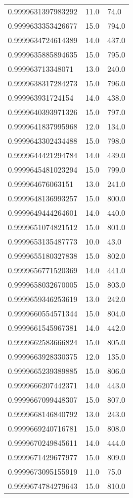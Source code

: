 \begin{center}
\begin{supertabular}[H]{p{0.30\textwidth}p{0.05\textwidth}p{0.05\textwidth}}
0.9999631397983292 & 11.0 & 74.0 \\ 
0.9999633353426677 & 15.0 & 794.0 \\ 
0.9999634724614389 & 14.0 & 437.0 \\ 
0.9999635885894635 & 15.0 & 795.0 \\ 
0.999963713348071 & 13.0 & 240.0 \\ 
0.9999638317284273 & 15.0 & 796.0 \\ 
0.999963931724154 & 14.0 & 438.0 \\ 
0.9999640393971326 & 15.0 & 797.0 \\ 
0.9999641837995968 & 12.0 & 134.0 \\ 
0.9999643302434488 & 15.0 & 798.0 \\ 
0.9999644421294784 & 14.0 & 439.0 \\ 
0.9999645481023294 & 15.0 & 799.0 \\ 
0.999964676063151 & 13.0 & 241.0 \\ 
0.9999648136993257 & 15.0 & 800.0 \\ 
0.9999649444264601 & 14.0 & 440.0 \\ 
0.9999651074821512 & 15.0 & 801.0 \\ 
0.9999653135487773 & 10.0 & 43.0 \\ 
0.9999655180327838 & 15.0 & 802.0 \\ 
0.9999656771520369 & 14.0 & 441.0 \\ 
0.9999658032670005 & 15.0 & 803.0 \\ 
0.9999659346253619 & 13.0 & 242.0 \\ 
0.9999660554571344 & 15.0 & 804.0 \\ 
0.9999661545967381 & 14.0 & 442.0 \\ 
0.9999662583666824 & 15.0 & 805.0 \\ 
0.9999663928330375 & 12.0 & 135.0 \\ 
0.9999665239389885 & 15.0 & 806.0 \\ 
0.9999666207442371 & 14.0 & 443.0 \\ 
0.9999667099448307 & 15.0 & 807.0 \\ 
0.9999668146840792 & 13.0 & 243.0 \\ 
0.9999669240716781 & 15.0 & 808.0 \\ 
0.9999670249845611 & 14.0 & 444.0 \\ 
0.9999671429677977 & 15.0 & 809.0 \\ 
0.9999673095155919 & 11.0 & 75.0 \\ 
0.9999674784279643 & 15.0 & 810.0 \\ 

\end{supertabular}
\end{center}
